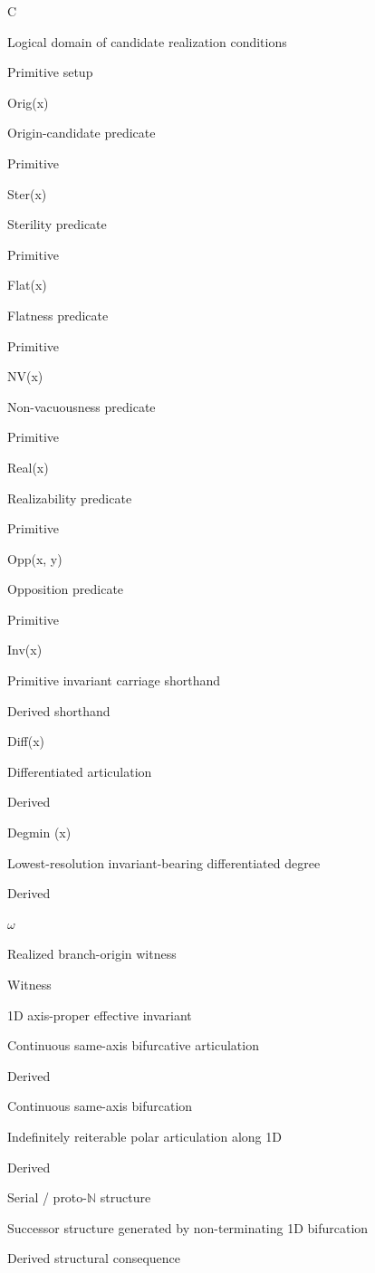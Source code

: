 \documentclass[11pt]{article}
\begin{document}
C

Logical domain of candidate realization conditions

Primitive setup

Orig(x)

Origin-candidate predicate

Primitive

Ster(x)

Sterility predicate

Primitive

Flat(x)

Flatness predicate

Primitive

NV(x)

Non-vacuousness predicate

Primitive

Real(x)

Realizability predicate

Primitive

Opp(x, y)

Opposition predicate

Primitive

Inv(x)

Primitive invariant carriage shorthand

Derived shorthand

Diff(x)

Differentiated articulation

Derived

Degmin (x)

Lowest-resolution invariant-bearing differentiated degree

Derived

$\omega$

Realized branch-origin witness

Witness



1D axis-proper effective invariant

Continuous same-axis bifurcative articulation

Derived

Continuous same-axis bifurcation

Indefinitely reiterable polar articulation along 1D

Derived

Serial / proto-$\mathbb{N}$ structure

Successor structure generated by non-terminating 1D bifurcation

Derived structural consequence
\end{document}
